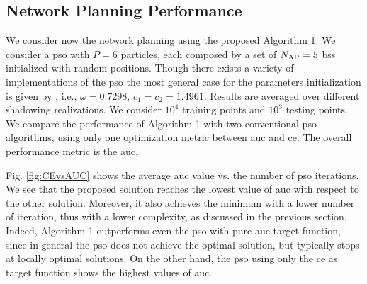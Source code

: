 \documentclass[conference,draftcls,onecolumn]{IEEEtran}
\begin{document}
\subsection{Network Planning Performance}

We consider now the network planning using the proposed Algorithm 1. We consider a \ac{pso} with $P=6$ particles, each composed by a set of $N_{\rm AP}=5$ \acp{bs} initialized with random positions. Though there exists a variety of implementations of the \ac{pso} the most general case for the parameters initialization is given by \cite{clerc2002}, i.e.,   $\omega=0.7298$, $c_1=c_2=1.4961$. Results are averaged over different shadowing realizations. We consider $10^4$ training  points and  $10^3$ testing points. We compare the performance of Algorithm 1 with two conventional \ac{pso} algorithms, using only one optimization metric between \ac{auc} and \ac{ce}. The overall performance metric is the \ac{auc}.

Fig. \ref{fig:CEvsAUC} shows the average \ac{auc} value vs. the number of \ac{pso} iterations. We see that the proposed solution reaches the lowest value of \ac{auc} with respect to the other solution. Moreover, it also achieves the minimum with a lower number of iteration, thus with a lower complexity, as discussed in the previous section. Indeed, Algorithm 1 outperforms even the \ac{pso} with pure \ac{auc} target function, since in general the \ac{pso} does not achieve the optimal solution, but typically stops at locally optimal solutions. On the other hand, the \ac{pso} using only the \ac{ce} as target function shows the highest values of \ac{auc}. 
\end{document}
